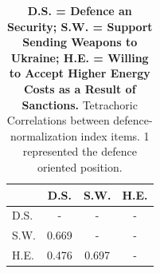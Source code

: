 \begin{table}[H]

\caption{\textbf{D.S. = Defence an Security; S.W. = Support Sending Weapons to Ukraine; H.E. = Willing to Accept Higher Energy Costs as a Result of Sanctions.} Tetrachoric Correlations between defence-normalization index items. 1 represented the defence oriented position. \label{tab:defence_corrs}}
\centering
\begin{tabular}[t]{lccc}
\toprule
 & D.S. & S.W. & H.E.\\
\midrule
D.S. & - & - & -\\
S.W. & 0.669 & - & -\\
H.E. & 0.476 & 0.697 & -\\
\bottomrule
\end{tabular}
\end{table}
